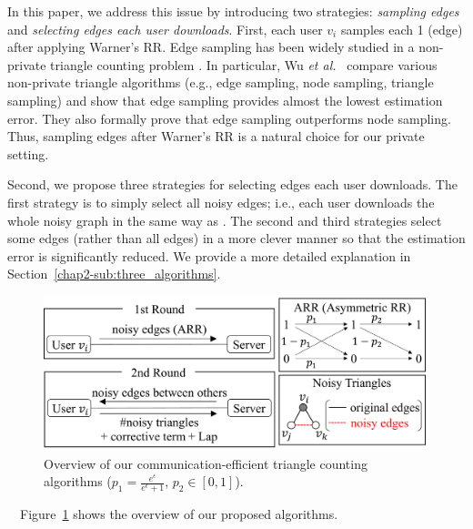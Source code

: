 In this paper, we address this issue by introducing two strategies: \textit{sampling edges} and \textit{selecting edges each user downloads}.
First, each user $v_i$ samples each 1 (edge) after applying Warner's RR.
Edge sampling has been widely studied in a
non-private triangle counting problem \cite{Bera_PODS20,Eden_FOCS15,Tsourakakis_KDD09,Wu_TKDE16}.
In particular, Wu \textit{et al.}~\cite{Wu_TKDE16} compare various non-private triangle algorithms (e.g., edge sampling, node sampling, triangle sampling) and show that edge sampling provides almost the lowest estimation error.
They also formally prove that edge sampling outperforms node sampling.
Thus, sampling edges after Warner's RR is a natural choice for our private setting.

Second, we propose three strategies for selecting edges each user downloads.
The first strategy is to simply select all noisy edges; i.e., each user downloads the whole noisy graph in the same way as \cite{Imola_USENIX21}.
The second and third strategies select some edges (rather than all edges) in a more clever manner so that the estimation error is significantly reduced.
We provide a more detailed explanation in Section~\ref{chap2-sub:three_algorithms}.

\begin{figure}[t]
  \centering
  \includegraphics[width=0.99\linewidth]{fig/algorithm_overview.pdf}
  
  \caption{Overview of our communication-efficient triangle counting algorithms
  ($p_1 =\frac{e^{\epsilon}}{e^{\epsilon}+1}$,
  $p_2 \in [0,1]$).}
  \label{chap2-fig:alg_overview}
\end{figure}

\smallskip
{}~~Figure~\ref{chap2-fig:alg_overview} shows the overview of our proposed algorithms.

